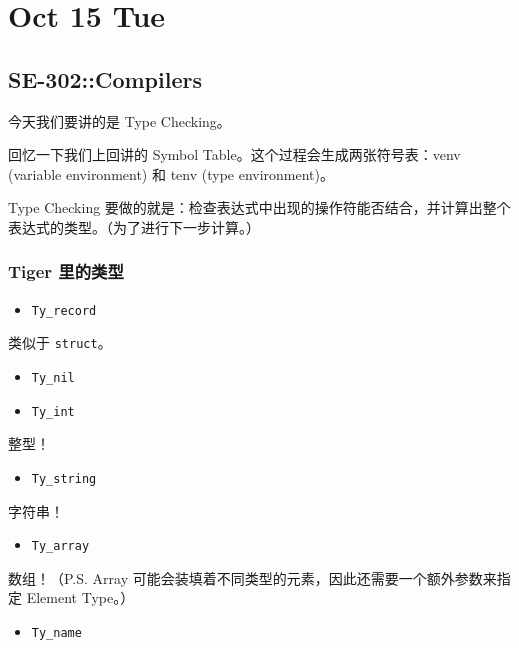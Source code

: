 \documentclass[
]{article}
\date{}
\begin{document}
\hypertarget{header-n0}{%
\section{Oct 15 Tue}\label{header-n0}}

\hypertarget{header-n2}{%
\subsection{SE-302::Compilers}\label{header-n2}}

今天我们要讲的是 Type Checking。

回忆一下我们上回讲的 Symbol Table。这个过程会生成两张符号表：venv
(variable environment) 和 tenv (type environment)。

Type Checking
要做的就是：检查表达式中出现的操作符能否结合，并计算出整个表达式的类型。（为了进行下一步计算。）

\hypertarget{header-n6}{%
\subsubsection{Tiger 里的类型}\label{header-n6}}

\begin{itemize}
\item
  \texttt{Ty\_record}
\end{itemize}

类似于 \texttt{struct}。

\begin{itemize}
\item
  \texttt{Ty\_nil}
\item
  \texttt{Ty\_int}
\end{itemize}

整型！

\begin{itemize}
\item
  \texttt{Ty\_string}
\end{itemize}

字符串！

\begin{itemize}
\item
  \texttt{Ty\_array}
\end{itemize}

数组！（P.S. Array
可能会装填着不同类型的元素，因此还需要一个额外参数来指定 Element
Type。）

\begin{itemize}
\item
  \texttt{Ty\_name}
\end{itemize}
\end{document}
